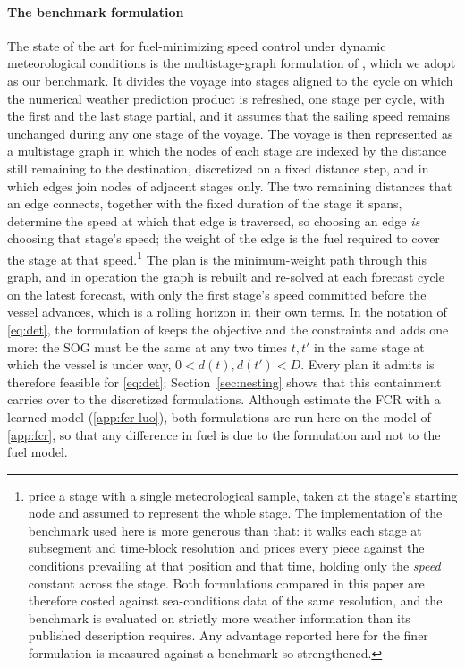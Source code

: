 \documentclass[review,authoryear]{elsarticle}
\begin{document}
\paragraph{The benchmark formulation}
The state of the art for fuel-minimizing speed control under dynamic meteorological conditions is the multistage-graph formulation of \citet{luo2024}, which we adopt as our benchmark. It divides the voyage into stages aligned to the cycle on which the numerical weather prediction product is refreshed, one stage per cycle, with the first and the last stage partial, and it assumes that the sailing speed remains unchanged during any one stage of the voyage. The voyage is then represented as a multistage graph in which the nodes of each stage are indexed by the distance still remaining to the destination, discretized on a fixed distance step, and in which edges join nodes of adjacent stages only. The two remaining distances that an edge connects, together with the fixed duration of the stage it spans, determine the speed at which that edge is traversed, so choosing an edge \emph{is} choosing that stage's speed; the weight of the edge is the fuel required to cover the stage at that speed.\footnote{\citet{luo2024} price a stage with a single meteorological sample, taken at the stage's starting node and assumed to represent the whole stage. The implementation of the benchmark used here is more generous than that: it walks each stage at subsegment and time-block resolution and prices every piece against the conditions prevailing at that position and that time, holding only the \emph{speed} constant across the stage. Both formulations compared in this paper are therefore costed against sea-conditions data of the same resolution, and the benchmark is evaluated on strictly more weather information than its published description requires. Any advantage reported here for the finer formulation is measured against a benchmark so strengthened.} The plan is the minimum-weight path through this graph, and in operation the graph is rebuilt and re-solved at each forecast cycle on the latest forecast, with only the first stage's speed committed before the vessel advances, which is a rolling horizon in their own terms. In the notation of \eqref{eq:det}, the formulation of \citet{luo2024} keeps the objective and the constraints and adds one more: the SOG must be the same at any two times $t,t'$ in the same stage at which the vessel is under way, $0<d(t),d(t')<D$. Every plan it admits is therefore feasible for \eqref{eq:det}; Section~\ref{sec:nesting} shows that this containment carries over to the discretized formulations. Although \citet{luo2024} estimate the FCR with a learned model (\ref{app:fcr-luo}), both formulations are run here on the model of \ref{app:fcr}, so that any difference in fuel is due to the formulation and not to the fuel model.
\end{document}

